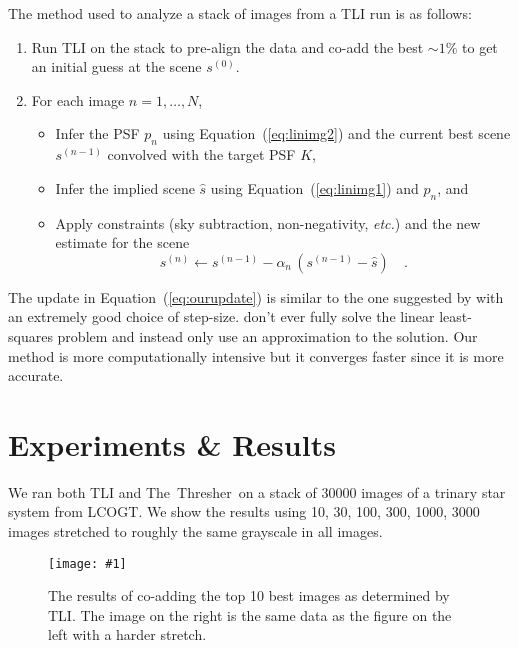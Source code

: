\documentclass[12pt,preprint]{aastex}
\newcommand{\project}[1]{{\sffamily #1}}
\newcommand{\TheThresher}{\project{The~Thresher}}
\newcommand{\LCOGT}{\project{LCOGT}}
\newcommand{\foreign}[1]{\emph{#1}}
\newcommand{\etc}{\foreign{etc.}}
\newcommand{\figlabel}[1]{\label{fig:#1}}
\newcommand{\Eq}[1]{Equation~(\ref{eq:#1})}
\newcommand{\eq}[1]{\Eq{#1}}
\newcommand{\eqlabel}[1]{\label{eq:#1}}
\newcommand{\kernel}{\ensuremath{K}}
\newcommand{\svec}{\ensuremath{s}}
\newcommand{\pvec}{\ensuremath{p}}
\newcommand{\dfmplot}[1]{%
\begin{center}%
    \texttt{[image: \#1]}%
\end{center}%
}
\begin{document}
The method used to analyze a stack of images from a TLI run is as follows:
\begin{enumerate}
    \item{Run TLI on the stack to pre-align the data and co-add the best
        $\sim 1\%$ to get an initial guess at the scene $\svec^{(0)}$.}
    \item{For each image $n = 1, \ldots, N$,
\begin{itemize}
    \item{Infer the PSF $\pvec_n$ using \eq{linimg2} and the current best
        scene $\svec^{(n-1)}$ convolved with the target PSF \kernel,}
    \item{Infer the implied scene $\hat{\svec}$ using \eq{linimg1} and
        $\pvec_n$, and}
    \item{Apply constraints (sky subtraction, non-negativity, \etc)
            and the new estimate for the scene
            \begin{equation}\eqlabel{ourupdate}
                \svec^{(n)} \gets \svec^{(n-1)} - \alpha_n \,
                (\svec^{(n-1)} - \hat{\svec}) \quad.
            \end{equation}
        }
\end{itemize}
        }
\end{enumerate}

The update in \eq{ourupdate} is similar to the one suggested by
\citet{hirsch} with an extremely good choice of step-size. \citet{hirsch}
don't ever fully solve the linear least-squares problem and instead only
use an approximation to the solution. Our method is more computationally
intensive but it converges faster since it is more accurate.

\section{Experiments \& Results}

We ran both TLI and \TheThresher\ on a stack of 30000 images of a
trinary star system from \LCOGT\@. We show the results using 10, 30, 100,
300, 1000, 3000 images stretched to roughly the same
grayscale in all images.

\begin{figure}[!htbp]
    \dfmplot{tli10.png}
    \caption{The results of co-adding the top 10 best images as determined
        by TLI\@. The image on the right is the same data as the figure on the
        left with a harder stretch.\figlabel{tli:10}}
\end{figure}
\end{document}
